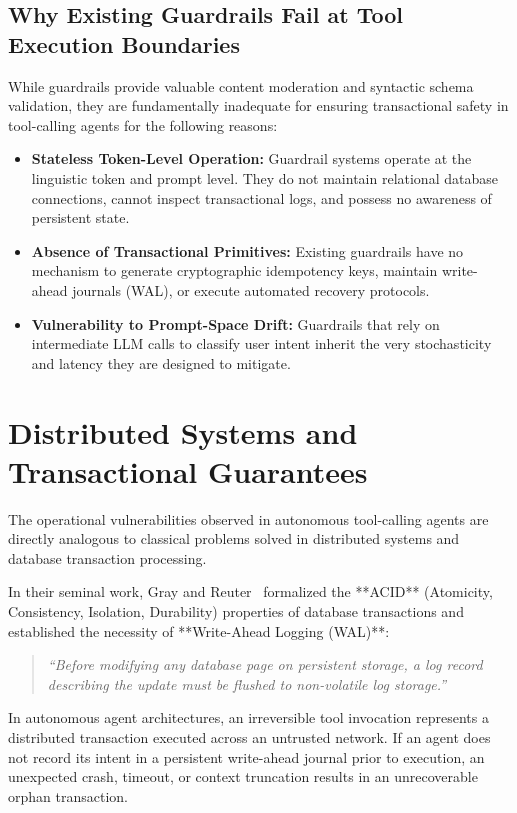 \subsection{Why Existing Guardrails Fail at Tool Execution Boundaries}
While guardrails provide valuable content moderation and syntactic schema validation, they are fundamentally inadequate for ensuring transactional safety in tool-calling agents for the following reasons:
\begin{itemize}
    \item \textbf{Stateless Token-Level Operation:} Guardrail systems operate at the linguistic token and prompt level. They do not maintain relational database connections, cannot inspect transactional logs, and possess no awareness of persistent state.
    \item \textbf{Absence of Transactional Primitives:} Existing guardrails have no mechanism to generate cryptographic idempotency keys, maintain write-ahead journals (WAL), or execute automated recovery protocols.
    \item \textbf{Vulnerability to Prompt-Space Drift:} Guardrails that rely on intermediate LLM calls to classify user intent inherit the very stochasticity and latency they are designed to mitigate.
\end{itemize}

\section{Distributed Systems and Transactional Guarantees}
\label{sec:lit_distributed}
The operational vulnerabilities observed in autonomous tool-calling agents are directly analogous to classical problems solved in distributed systems and database transaction processing.

In their seminal work, Gray and Reuter~\cite{gray1993transaction} formalized the **ACID** (Atomicity, Consistency, Isolation, Durability) properties of database transactions and established the necessity of **Write-Ahead Logging (WAL)**:
\begin{quote}
    \textit{``Before modifying any database page on persistent storage, a log record describing the update must be flushed to non-volatile log storage.''}
\end{quote}
In autonomous agent architectures, an irreversible tool invocation represents a distributed transaction executed across an untrusted network. If an agent does not record its intent in a persistent write-ahead journal prior to execution, an unexpected crash, timeout, or context truncation results in an unrecoverable orphan transaction.

